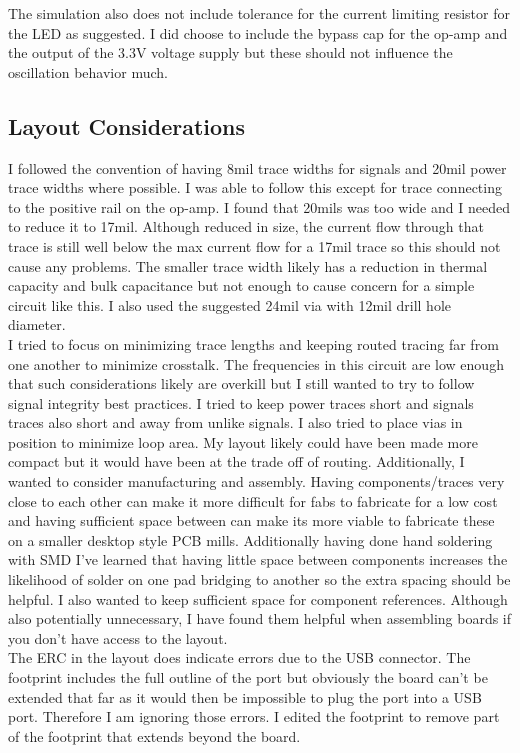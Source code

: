 The simulation also does not include tolerance for the current limiting resistor for the LED as suggested.
I did choose to include the bypass cap for the op-amp and the output of the 3.3V voltage supply but these
should not influence the oscillation behavior much.

\subsection*{Layout Considerations}
I followed the convention of having 8mil trace widths for signals and 20mil power trace widths where possible.
I was able to follow this except for trace connecting to the positive rail on the op-amp. I found that 20mils was
too wide and I needed to reduce it to 17mil. Although reduced in size, the current flow through that trace is still
well below the max current flow for a 17mil trace so this should not cause any problems. The smaller trace width
likely has a reduction in thermal capacity and bulk capacitance but not enough to cause concern for a simple circuit
like this. I also used the suggested 24mil via with 12mil drill hole diameter.\\


I tried to focus on minimizing trace lengths and keeping routed tracing far from one another to minimize crosstalk.
The frequencies in this circuit are low enough that such considerations likely are overkill but I still
wanted to try to follow signal integrity best practices. I tried to keep power traces short and signals traces also short and away
from unlike signals. I also tried to place vias in position to minimize loop area.
My layout likely could have been made more compact but it would have been at the trade
off of routing. Additionally, I wanted to consider manufacturing and assembly. Having components/traces very close to
each other can make it more difficult for fabs to fabricate for a low cost and having sufficient space between can make its
more viable to fabricate these on a smaller desktop style PCB mills. Additionally having done hand soldering with 
SMD I've learned that having little space between components increases the likelihood of solder on one
pad bridging to another so the extra spacing should be helpful. I also wanted to keep sufficient space for component references.
Although also potentially unnecessary, I have found them helpful when assembling boards if you don't have access to the layout.\\

The ERC in the layout does indicate errors due to the USB connector. The footprint includes the full outline of the port but 
obviously the board can't be extended that far as it would then be impossible to plug the port into a USB port. Therefore I am ignoring
those errors. I edited the footprint to remove part of the footprint that extends beyond the board.
